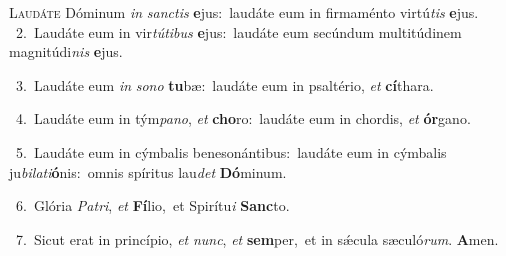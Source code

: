 \lettrine{\initial\textcolor{\initialcolor}{L}}{audáte} Dóminum \textit{in} \textit{sanc}\-\textit{tis} \textbf{e}\-jus:~\star laudáte eum in firmaménto virtú\textit{tis} \textbf{e}\-jus.\\
{\numbfont\textcolor{\numbcolor}{~2.}}~Laudáte eum in vir\-\textit{tú}\-\textit{ti}\textit{bus} \textbf{e}\-jus:~\star laudáte eum secúndum multitúdinem magnitúdi\textit{nis} \textbf{e}\-jus.\par
{\numbfont\textcolor{\numbcolor}{~3.}}~Laudáte eum \textit{in} \textit{so}\-\textit{no} \textbf{tu}\-bæ:~\star laudáte eum in psaltério, \textit{et} \textbf{cí}\-thara.\par
{\numbfont\textcolor{\numbcolor}{~4.}}~Laudáte eum in tým\-\textit{pa}\-\textit{no}, \textit{et} \textbf{cho}\-ro:~\star laudáte eum in chordis, \textit{et} \textbf{ór}\-gano.\par
{\numbfont\textcolor{\numbcolor}{~5.}}~Laudáte eum in cýmbalis benesonántibus:~\dagger laudáte eum in cýmbalis ju\-\textit{bi}\-\textit{la}\textit{ti}\textbf{ó}nis:~\star omnis spíritus lau\textit{det} \textbf{Dó}\-minum.\par
{\numbfont\textcolor{\numbcolor}{~6.}}~Glória \textit{Pa}\-\textit{tri}, \textit{et} \textbf{Fí}\-lio,~\star et Spirítu\textit{i} \textbf{Sanc}\-to.\par
{\numbfont\textcolor{\numbcolor}{~7.}}~Sicut erat in princípio, \textit{et} \textit{nunc}\-, \textit{et} \textbf{sem}\-per,~\star et in sǽcula sæculó\-\textit{rum}\-. \textbf{A}\-men.\par
